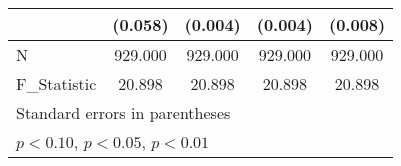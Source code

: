 {\begin{tabular}{l*{4}{c}}
            &     (0.058)         &     (0.004)         &     (0.004)         &     (0.008)         \\
\hline
N           &     929.000         &     929.000         &     929.000         &     929.000         \\
F\_Statistic &      20.898         &      20.898         &      20.898         &      20.898         \\
\hline\hline
\multicolumn{5}{l}{\footnotesize Standard errors in parentheses}\\
\multicolumn{5}{l}{\footnotesize \sym{*} \(p<0.10\), \sym{**} \(p<0.05\), \sym{***} \(p<0.01\)}\\
\end{tabular}
}
